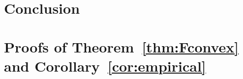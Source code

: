 \documentclass{article}
\theoremstyle{plain}
\theoremstyle{definition}
\theoremstyle{remark}
\begin{document}
\section{Conclusion}






\newpage
\appendix
\onecolumn

\section{Proofs of Theorem~\ref{thm:Fconvex} and Corollary~\ref{cor:empirical}} \label{apdx:proofs}
\end{document}
